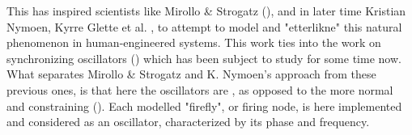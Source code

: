 	This has inspired scientists like Mirollo \& Strogatz (), and in later time Kristian Nymoen, Kyrre Glette et al. \cite{nymoen_synch}, to attempt to model and "etterlikne" this natural phenomenon in human-engineered systems. This work ties into the work on synchronizing oscillators () which has been subject to study for some time now. What separates Mirollo \& Strogatz and K. Nymoen's approach from these previous ones, is that here the oscillators are , as opposed to the more normal and constraining  ().
	Each modelled "firefly", or firing node, is here implemented and considered as an oscillator, characterized by its phase and frequency. 
	
	